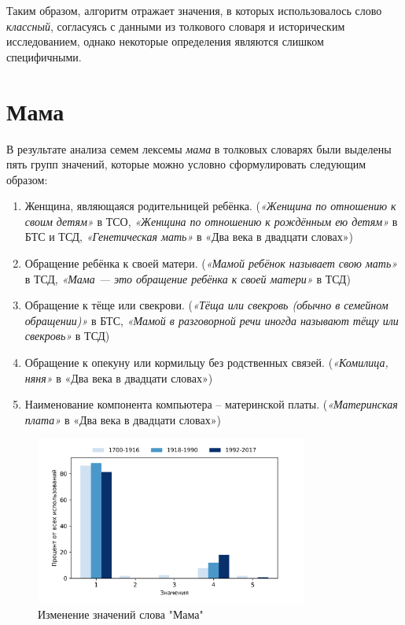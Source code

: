Таким образом, алгоритм отражает значения, в которых использовалось
слово \textit{классный}, согласуясь с данными из толкового словаря и историческим исследованием,
однако некоторые определения являются слишком специфичными.

\section*{Мама}

В результате анализа семем лексемы \textit{мама} в толковых словарях были выделены
пять групп значений, которые можно условно сформулировать следующим образом:

\begin{enumerate}
    \item Женщина, являющаяся родительницей ребёнка.
(\textit{«Женщина по отношению к своим детям»} в ТСО,
\textit{«Женщина по отношению к рождённым ею детям»} в БТС и ТСД,
\textit{«Генетическая мать»} в «Два века в двадцати словах»)

    \item Обращение ребёнка к своей матери.
(\textit{«Мамой ребёнок называет свою мать»} в ТСД,
\textit{«Мама — это обращение ребёнка к своей матери»} в ТСД)

    \item Обращение к тёще или свекрови.
(\textit{«Тёща или свекровь (обычно в семейном обращении)»} в БТС,
\textit{«Мамой в разговорной речи иногда называют тёщу или свекровь»} в ТСД)

    \item Обращение к опекуну или кормильцу без родственных связей.
(\textit{«Комилица, няня»} в «Два века в двадцати словах»)

    \item Наименование компонента компьютера – материнской платы.
(\textit{«Материнская плата»} в «Два века в двадцати словах»)
\end{enumerate}

\begin{figure}[H]
	\centering
	\includegraphics[width=0.8\textwidth]{img/visualizations/mama_minimal}
	\caption{Изменение значений слова "Мама"}
	\label{fig:Мама}
\end{figure}

